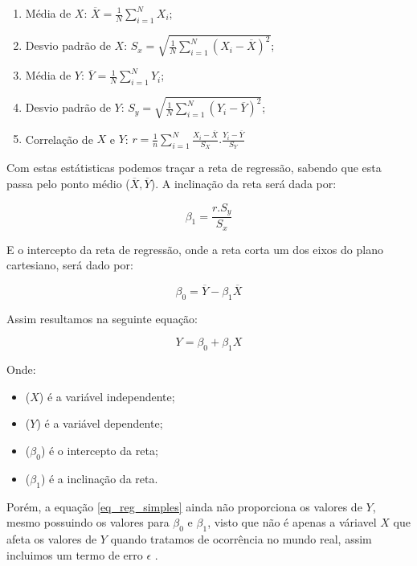 \documentclass[
	12pt,				%
	openright,			%
	oneside,			%
	a4paper,			%
	english,			%
	brazil				%
	]{abntex2}
\begin{document}
\begin{enumerate}
	\item Média de $X$: $\overline{X} = \frac{1}{N} \sum_{i=1}^{N} X_i$;
	\item Desvio padrão de $X$: $S_x = \sqrt{ \frac{1}{N} \sum_{i=1}^{N} (X_i - \overline{X})^2 }$;
	\item Média de $Y$: $\overline{Y} = \frac{1}{N} \sum_{i=1}^{N} Y_i$;
	\item Desvio padrão de $Y$: $S_y = \sqrt{ \frac{1}{N} \sum_{i=1}^{N} (Y_i - \overline{Y})^2 }$;
	\item Correlação de $X$ e $Y$: $r = \frac{1}{n} \sum_{i=1}^{N} \frac{X_i - \overline{X}}{S_X} . \frac{Y_i - \overline{Y}}{S_Y}$
\end{enumerate}

Com estas estátisticas podemos traçar a reta de regressão, sabendo que esta passa pelo ponto médio
($\overline{X}, \overline{Y}$). A inclinação da reta será dada por:

\begin{equation}
	\label{inclinacao_reta}
	\beta_1 = \frac{r.S_y}{S_x}
\end{equation}

E o intercepto da reta de regressão, onde a reta corta um dos eixos do plano cartesiano, 
será dado por:

\begin{equation}
	\label{intercepto_reta}
	\beta_0 = \overline{Y} - \beta_1 \overline{X}
\end{equation}

Assim resultamos na seguinte equação:

\begin{equation}
\label{eq_reg_simples}
	Y = \beta_0 + \beta_1X
\end{equation}

Onde:
\begin{itemize}
	\item ($X$) é a variável independente;
	\item ($Y$) é a variável dependente;
	\item ($\beta_0$) é o intercepto da reta;
	\item ($\beta_1$) é a inclinação da reta. 
\end{itemize}

Porém, a equação \ref{eq_reg_simples} ainda não proporciona os valores de $Y$, mesmo possuindo
os valores para $\beta_0$ e $\beta_1$, visto que não é apenas a váriavel $X$ que afeta os valores de
$Y$ quando tratamos de ocorrência no mundo real, assim incluimos um termo de erro $\epsilon$ 
\cite{modelos_regressao_linear}.
\end{document}
